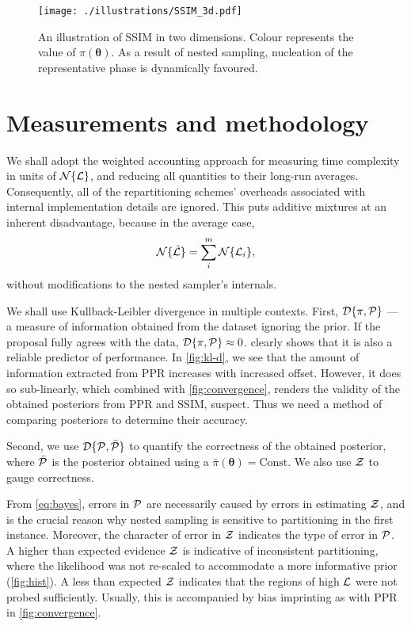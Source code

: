 \documentclass[usenatbib]{mnras}
\begin{document}
\begin{figure}
  \centering
  \texttt{[image: ./illustrations/SSIM\_3d.pdf]}
  \caption{An illustration of SSIM in two dimensions. Colour represents the value of $\pi(\bm{\theta})$. As a result of nested sampling, nucleation of the representative phase is dynamically favoured.}
  \label{fig:mixture-3d}
\end{figure}


\section{Measurements and methodology}
We shall adopt the weighted accounting approach \citep{Cormen} for
measuring time complexity in units of \({\cal N}\{{\cal L}\}\), and
reducing all quantities to their long-run averages. Consequently, all
of the repartitioning schemes' overheads associated with internal
implementation details are ignored. This puts additive mixtures at an
inherent disadvantage, because in the average case,
\begin{equation}
  \label{eq:additive-t-complexity}
  {\cal N}\{ \hat{\cal L}\} = \sum_{i}^{m} {\cal N}\{{\cal L}_{i}\}, 
\end{equation}
without modifications to the nested sampler's internals.


We shall use Kullback-Leibler divergence in multiple contexts. First,
${\cal D}\{\pi, {\cal P}\}$ --- a measure of information obtained from
the dataset ignoring the prior. If the proposal fully agrees with the
data, ${\cal D}\{ \pi, {\cal P} \} \approx 0$.  
clearly shows that it is also a reliable predictor of performance. In
\cref{fig:kl-d}, we see that the amount of information extracted from
PPR increases with increased offset. However, it does so sub-linearly,
which combined with \cref{fig:convergence}, renders the validity of
the obtained posteriors from PPR and SSIM, suspect. Thus we need a
method of comparing posteriors to determine their accuracy.

Second, we use ${\cal D}\{ {\cal P}, \bar{\cal P} \}$ to quantify the
correctness of the obtained posterior, where $\bar{\cal P}$ is the
posterior obtained using a $\bar{\pi}(\bm{\theta}) = \text{Const}$. We
also use ${\cal Z}$ to gauge correctness.

From \cref{eq:bayes}, errors in ${\cal P}$ are necessarily caused by
errors in estimating ${\cal Z}$, and is the crucial reason why nested
sampling is sensitive to partitioning in the first instance. Moreover,
the character of error in ${\cal Z}$ indicates the type of error in
${\cal P}$. A higher than expected evidence ${\cal Z}$ is indicative
of inconsistent partitioning, where the likelihood was not re-scaled
to accommodate a more informative prior (\cref{fig:hist}). A less than
expected ${\cal Z}$ indicates that the regions of high ${\cal L}$ were
not probed sufficiently. Usually, this is accompanied by bias
imprinting as with PPR in \cref{fig:convergence}.
\end{document}
